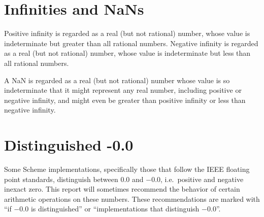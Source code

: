 \section{Infinities and NaNs}

Positive infinity is regarded as a real (but not rational) number,
whose value is indeterminate but greater than all rational numbers.
Negative infinity is regarded as a real (but not rational) number,
whose value is indeterminate but less than all rational numbers.

A NaN is regarded as a real (but not rational) number whose value is
so indeterminate that it might represent any real number, including
positive or negative infinity, and might even be greater than positive
infinity or less than negative infinity.

\section{Distinguished -0.0}

Some Scheme implementations, specifically those that follow the IEEE
floating point standards, distinguish between $0.0$ and $-0.0$, i.e.\
positive and negative inexact zero.  This report will sometimes
recommend the behavior of certain arithmetic operations on these
numbers.  These recommendations are marked with ``if $-0.0$ is
distinguished'' or ``implementations that distinguish $-0.0$''.

